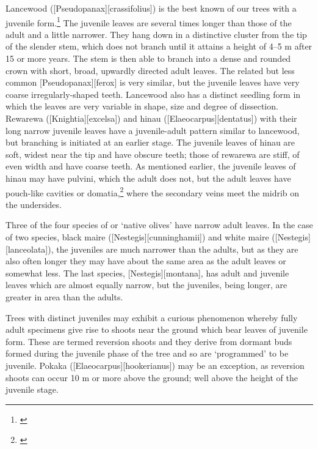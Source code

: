 Lancewood ([Pseudopanax][crassifolius]) is the best known of our trees with a juvenile form.\footnote{\cite{laing1906plants}}
The juvenile leaves are several times longer than those of the adult and a little narrower.
They hang down in a distinctive cluster from the tip of the slender stem, which does not branch until it attains a height of 4--5 m after 15 or more years.
The stem is then able to branch into a dense and rounded crown with short, broad, upwardly directed adult leaves.
The related but less common [Pseudopanax][ferox] is very similar, but the juvenile leaves have very coarse irregularly-shaped teeth.
Lancewood also has a distinct seedling form in which the leaves are very variable in shape, size and degree of dissection.
Rewarewa ([Knightia][excelsa]) and hinau ([Elaeocarpus][dentatus]) with their long narrow juvenile leaves have a juvenile-adult pattern similar to lancewood, but branching is initiated at an earlier stage.
The juvenile leaves of hinau are soft, widest near the tip and have obscure teeth; those of rewarewa are stiff, of even width and have coarse teeth.
As mentioned earlier, the juvenile leaves of hinau may have pulvini, which the adult does not, but the adult leaves have pouch-like cavities or domatia,\footnote{\cite{sampson1965domatia}} where the secondary veins meet the midrib on the undersides.

Three of the four species of  or `native olives' have narrow adult leaves.
In the case of two species, black maire ([Nestegis][cunninghamii]) and white maire ([Nestegis][lanceolata]), the juveniles are much narrower than the adults, but as they are also often longer they may have about the same area as the adult leaves or somewhat less.
The last species, [Nestegis][montana], has adult and juvenile leaves which are almost equally narrow, but the juveniles, being longer, are greater in area than the adults.

Trees with distinct juveniles may exhibit a curious phenomenon whereby fully adult specimens give rise to shoots near the ground which bear leaves of juvenile form.
These are termed reversion shoots and they derive from dormant buds formed during the juvenile phase of the tree and so are `programmed' to be juvenile.
Pokaka ([Elaeocarpus][hookerianus]) may be an exception, as reversion shoots can occur 10 m or more above the ground; well above the height of the juvenile stage.

